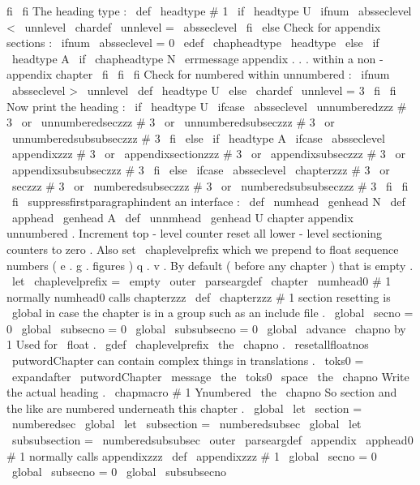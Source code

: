 {{{{{fi
\
fi
%
The
heading
type
:
\
def
\
headtype
{
#
1
}
%
\
if
\
headtype
U
%
\
ifnum
\
absseclevel
<
\
unnlevel
\
chardef
\
unnlevel
=
\
absseclevel
\
fi
\
else
%
Check
for
appendix
sections
:
\
ifnum
\
absseclevel
=
0
\
edef
\
chapheadtype
{
\
headtype
}
%
\
else
\
if
\
headtype
A
\
if
\
chapheadtype
N
%
\
errmessage
{
appendix
.
.
.
within
a
non
-
appendix
chapter
}
%
\
fi
\
fi
\
fi
%
Check
for
numbered
within
unnumbered
:
\
ifnum
\
absseclevel
>
\
unnlevel
\
def
\
headtype
{
U
}
%
\
else
\
chardef
\
unnlevel
=
3
\
fi
\
fi
%
Now
print
the
heading
:
\
if
\
headtype
U
%
\
ifcase
\
absseclevel
\
unnumberedzzz
{
#
3
}
%
\
or
\
unnumberedseczzz
{
#
3
}
%
\
or
\
unnumberedsubseczzz
{
#
3
}
%
\
or
\
unnumberedsubsubseczzz
{
#
3
}
%
\
fi
\
else
\
if
\
headtype
A
%
\
ifcase
\
absseclevel
\
appendixzzz
{
#
3
}
%
\
or
\
appendixsectionzzz
{
#
3
}
%
\
or
\
appendixsubseczzz
{
#
3
}
%
\
or
\
appendixsubsubseczzz
{
#
3
}
%
\
fi
\
else
\
ifcase
\
absseclevel
\
chapterzzz
{
#
3
}
%
\
or
\
seczzz
{
#
3
}
%
\
or
\
numberedsubseczzz
{
#
3
}
%
\
or
\
numberedsubsubseczzz
{
#
3
}
%
\
fi
\
fi
\
fi
\
suppressfirstparagraphindent
}
%
an
interface
:
\
def
\
numhead
{
\
genhead
N
}
\
def
\
apphead
{
\
genhead
A
}
\
def
\
unnmhead
{
\
genhead
U
}
%
chapter
appendix
unnumbered
.
Increment
top
-
level
counter
reset
%
all
lower
-
level
sectioning
counters
to
zero
.
%
%
Also
set
\
chaplevelprefix
which
we
prepend
to
float
sequence
numbers
%
(
e
.
g
.
figures
)
q
.
v
.
By
default
(
before
any
chapter
)
that
is
empty
.
\
let
\
chaplevelprefix
=
\
empty
%
\
outer
\
parseargdef
\
chapter
{
\
numhead0
{
#
1
}
}
%
normally
numhead0
calls
chapterzzz
\
def
\
chapterzzz
#
1
{
%
%
section
resetting
is
\
global
in
case
the
chapter
is
in
a
group
such
%
as
an
include
file
.
\
global
\
secno
=
0
\
global
\
subsecno
=
0
\
global
\
subsubsecno
=
0
\
global
\
advance
\
chapno
by
1
%
%
Used
for
\
float
.
\
gdef
\
chaplevelprefix
{
\
the
\
chapno
.
}
%
\
resetallfloatnos
%
%
\
putwordChapter
can
contain
complex
things
in
translations
.
\
toks0
=
\
expandafter
{
\
putwordChapter
}
%
\
message
{
\
the
\
toks0
\
space
\
the
\
chapno
}
%
%
%
Write
the
actual
heading
.
\
chapmacro
{
#
1
}
{
Ynumbered
}
{
\
the
\
chapno
}
%
%
%
So
section
and
the
like
are
numbered
underneath
this
chapter
.
\
global
\
let
\
section
=
\
numberedsec
\
global
\
let
\
subsection
=
\
numberedsubsec
\
global
\
let
\
subsubsection
=
\
numberedsubsubsec
}
\
outer
\
parseargdef
\
appendix
{
\
apphead0
{
#
1
}
}
%
normally
calls
appendixzzz
%
\
def
\
appendixzzz
#
1
{
%
\
global
\
secno
=
0
\
global
\
subsecno
=
0
\
global
\
subsubsecno
}}}}}
